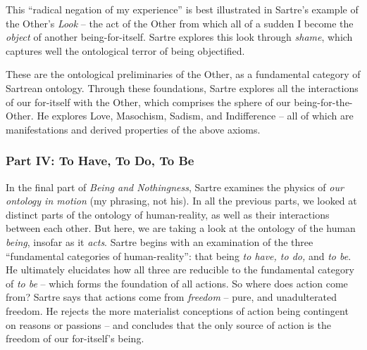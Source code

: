 This \enquote{radical negation of my experience} is best illustrated in Sartre's example of the Other's \emph{Look} -- the act of the Other from which all of a sudden I become the \emph{object} of another being-for-itself. Sartre explores this look through \emph{shame}, which captures well the ontological terror of being objectified. 

These are the ontological preliminaries of the Other, as a fundamental category of Sartrean ontology. Through these foundations, Sartre explores all the interactions of our for-itself with the Other, which comprises the sphere of our being-for-the-Other. He explores Love, Masochism, Sadism, and Indifference -- all of which are manifestations and derived properties of the above axioms.

\subsubsection{Part IV: To Have, To Do, To Be}

In the final part of \emph{Being and Nothingness}, Sartre examines the physics of \emph{our ontology in motion} (my phrasing, not his). In all the previous parts, we looked at distinct parts of the ontology of human-reality, as well as their interactions between each other. But here, we are taking a look at the ontology of the human \emph{being}, insofar as it \emph{acts}. Sartre begins with an examination of the three \enquote{fundamental categories of human-reality}: that being \emph{to have, to do,} and \emph{to be}. He ultimately elucidates how all three are reducible to the fundamental category of \emph{to be} -- which forms the foundation of all actions. So where does action come from? Sartre says that actions come from \emph{freedom} -- pure, and unadulterated freedom. He rejects the more materialist conceptions of action being contingent on reasons or passions \autocite[574]{sartre} -- and concludes that the only source of action is the freedom of our for-itself's being.

